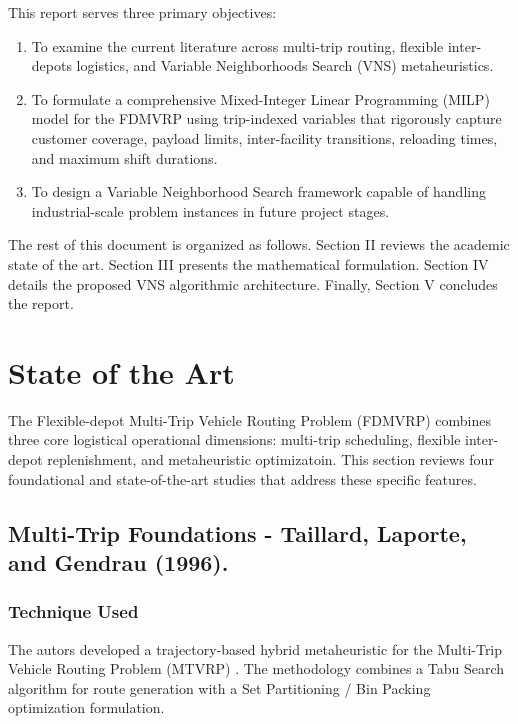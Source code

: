 \documentclass[conference]{IEEEtran}
\begin{document}
This report serves three primary objectives: 
\begin{enumerate}
    \item To examine the current literature across multi-trip routing, flexible inter-depots logistics, and Variable Neighborhoods Search (VNS) metaheuristics.
    \item To formulate a comprehensive Mixed-Integer Linear Programming (MILP) model for the FDMVRP using trip-indexed variables that rigorously capture customer coverage, payload limits, inter-facility transitions, reloading times, and maximum shift durations.
    \item To design a Variable Neighborhood Search framework capable of handling industrial-scale problem instances in future project stages.\\
\end{enumerate}
The rest of this document is organized as follows. Section II reviews the academic state of the art. Section III presents the mathematical formulation. Section IV details the proposed VNS algorithmic architecture. Finally, Section V concludes the report.

\section{State of the Art}
The Flexible-depot Multi-Trip Vehicle Routing Problem (FDMVRP) combines three core logistical operational dimensions: multi-trip scheduling, flexible inter-depot replenishment, and metaheuristic optimizatoin. This section reviews four foundational and state-of-the-art studies that address these specific features.

\subsection{Multi-Trip Foundations - Taillard, Laporte, and Gendrau (1996).}
\textit{\cite{taillard1996vehicle}}

\subsubsection{Technique Used}
The autors developed a trajectory-based hybrid metaheuristic for the Multi-Trip Vehicle Routing Problem (MTVRP) \cite{taillard1996vehicle}. The methodology combines a Tabu Search algorithm for route generation with a Set Partitioning / Bin Packing optimization formulation.
\end{document}
